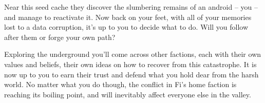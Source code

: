 Near this seed cache they discover the slumbering remains of an android -- you -- and manage to reactivate it. Now back on your feet, with all of your memories lost to a data corruption, it's up to you to decide what to do. Will you follow after them or forge your own path?

Exploring the underground you'll come across other factions, each with their own values and beliefs, their own ideas on how to recover from this catastrophe. It is now up to you to earn their trust and defend what you hold dear from the harsh world. No matter what you do though, the conflict in Fi's home faction is reaching its boiling point, and will inevitably affect everyone else in the valley.

